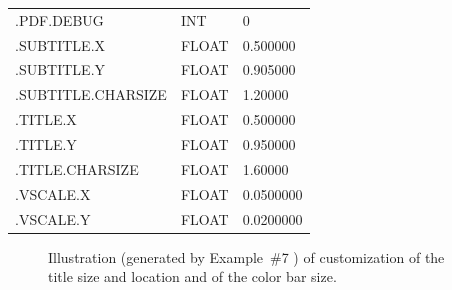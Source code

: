 \begin{examples}
{\begin{minipage}[t]{\hsize}
{{{\begin{tabular}{lll}
.PDF.DEBUG              &     INT       &      0 \\
.SUBTITLE.X             &     FLOAT     &       0.500000\\
.SUBTITLE.Y             &     FLOAT     &       0.905000\\
.SUBTITLE.CHARSIZE      &     FLOAT     &        1.20000\\
.TITLE.X                &     FLOAT     &       0.500000\\
.TITLE.Y                &     FLOAT     &       0.950000\\
.TITLE.CHARSIZE         &     FLOAT     &        1.60000\\
.VSCALE.X               &     FLOAT     &      0.0500000\\
.VSCALE.Y               &     FLOAT     &      0.0200000
\end{tabular}
}}}
\end{minipage}
}
\end{examples}
%
\begin{figure}[h!]
\caption{%
\label{page:moll_customize}%
\label{fig:moll_customize}%
Illustration (generated by 
Example~\#7
) 
of customization of the title size and location and of the color bar size.}
\end{figure}

